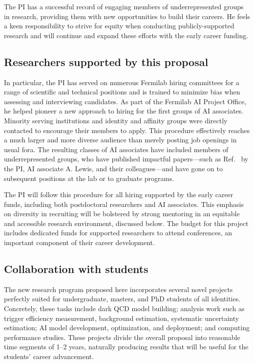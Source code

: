 The PI has a successful record of engaging members of underrepresented groups in research,
providing them with new opportunities to build their careers.
He feels a keen responsibility to strive for equity when conducting publicly-supported research
and will continue and expand these efforts with the early career funding.

\subsection{Researchers supported by this proposal}

In particular, the PI has served on numerous Fermilab hiring committees for a range of scientific and technical positions
and is trained to minimize bias when assessing and interviewing candidates.
As part of the Fermilab AI Project Office, he helped pioneer a new approach to hiring for the first groups of AI associates.
Minority serving institutions and identity and affinity groups were directly contacted to encourage their members to apply.
This procedure effectively reaches a much larger and more diverse audience than merely posting job openings in usual fora.
The resulting classes of AI associates have included members of underrepresented groups,
who have published impactful papers---such as Ref.~\cite{Ciprijanovic:2023hrw} by the PI,
AI associate A. Lewis, and their colleagues---and have gone on to subsequent positions at the lab or to graduate programs.

The PI will follow this procedure for all hiring supported by the early career funds,
including both postdoctoral researchers and AI associates.
This emphasis on diversity in recruiting will be bolstered by strong mentoring
in an equitable and accessible research environment, discussed below.
The budget for this project includes dedicated funds for supported researchers to attend conferences,
an important component of their career development.

\subsection{Collaboration with students}

The new research program proposed here incorporates several novel projects
perfectly suited for undergraduate, masters, and PhD students of all identities.
Concretely, these tasks include dark QCD model building;
analysis work such as trigger efficiency measurement, background estimation, systematic uncertainty estimation;
AI model development, optimization, and deployment; and computing performance studies.
These projects divide the overall proposal into reasonable time segments of 1--2 years,
naturally producing results that will be useful for the students' career advancement.

